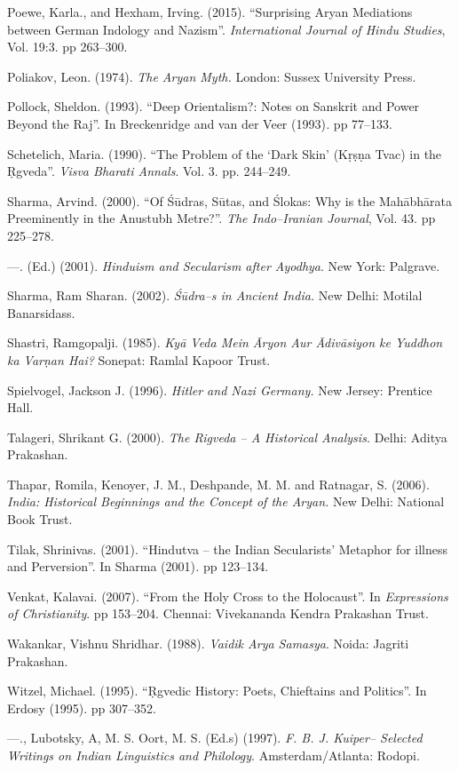 \begin{thebibliography}{99}
  Poewe, Karla., and Hexham, Irving. (2015). “Surprising Aryan Mediations between German Indology and Nazism”. \textit{International Journal of Hindu Studies}, Vol. 19:3. pp 263–300.

  Poliakov, Leon. (1974). \textit{The Aryan Myth.} London: Sussex University Press.

  Pollock, Sheldon. (1993). “Deep Orientalism?: Notes on Sanskrit and Power Beyond the Raj”. In Breckenridge and van der Veer (1993)\textit{. }pp 77–133.

  Schetelich, Maria. (1990). “The Problem of the ‘Dark Skin’ (Kṛṣṇa Tvac) in the Ṛgveda”. \textit{Visva Bharati Annals}. Vol. 3. pp. 244–249.

  Sharma, Arvind. (2000). “Of Śūdras, Sūtas, and Ślokas: Why is the Mahābhārata Preeminently in the Anustubh Metre?”. \textit{The Indo–Iranian Journal}, Vol. 43. pp 225–278.

  —. (Ed.) (2001). \textit{Hinduism and Secularism after Ayodhya}. New York: Palgrave.

  Sharma, Ram Sharan. (2002). \textit{Śūdra–s in Ancient India.} New Delhi: Motilal Banarsidass.

  Shastri, Ramgopalji. (1985). \textit{Kyā Veda Mein Āryon Aur Ādivāsiyon ke Yuddhon ka Varṇan Hai?} Sonepat: Ramlal Kapoor Trust.

  Spielvogel, Jackson J. (1996). \textit{Hitler and Nazi Germany.} New Jersey: Prentice Hall.

  Talageri, Shrikant G. (2000). \textit{The Rigveda – A Historical Analysis.} Delhi: Aditya Prakashan.

  Thapar, Romila, Kenoyer, J. M., Deshpande, M. M. and Ratnagar, S. (2006). \textit{India: Historical Beginnings and the Concept of the Aryan. }New Delhi: National Book Trust.

  Tilak, Shrinivas. (2001). “Hindutva – the Indian Secularists’ Metaphor for illness and Perversion”. In Sharma (2001)\textit{.} pp 123–134.

  Venkat, Kalavai. (2007). “From the Holy Cross to the Holocaust”. In \textit{Expressions of Christianity}. pp 153–204. Chennai: Vivekananda Kendra Prakashan Trust.

  Wakankar, Vishnu Shridhar. (1988). \textit{Vaidik Arya Samasya}. Noida: Jagriti Prakashan.

  Witzel, Michael. (1995). “Ṛgvedic History: Poets, Chieftains and Politics”. In Erdosy (1995). pp 307–352.

  —., Lubotsky, A, M. S. Oort, M. S. (Ed.s) (1997). \textit{F. B. J. Kuiper– Selected Writings on Indian Linguistics and Philology}. Amsterdam/Atlanta: Rodopi.

 \end{thebibliography}

